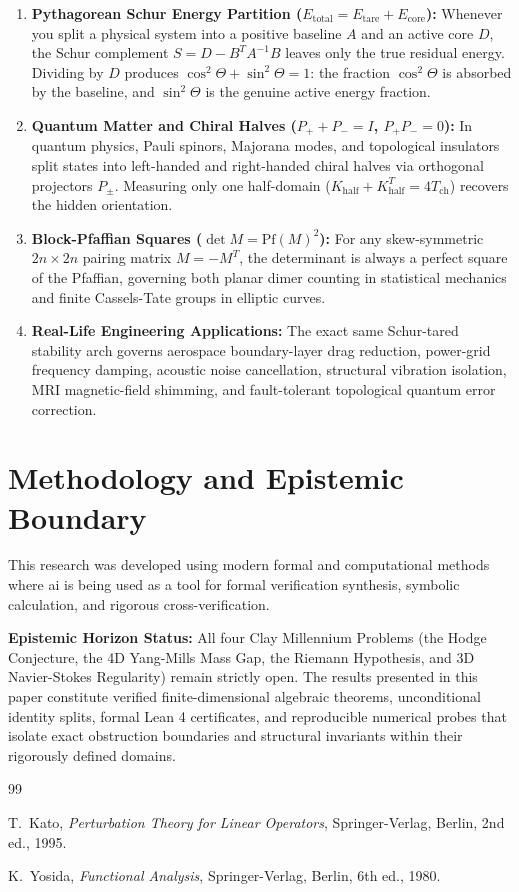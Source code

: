 \documentclass[11pt,a4paper]{article}
\theoremstyle{definition}
\begin{document}
\begin{enumerate}
  \item \textbf{Pythagorean Schur Energy Partition ($E_{\mathrm{total}} = E_{\mathrm{tare}} + E_{\mathrm{core}}$):} Whenever you split a physical system into a positive baseline $A$ and an active core $D$, the Schur complement $S = D - B^T A^{-1} B$ leaves only the true residual energy. Dividing by $D$ produces $\cos^2\Theta + \sin^2\Theta = 1$: the fraction $\cos^2\Theta$ is absorbed by the baseline, and $\sin^2\Theta$ is the genuine active energy fraction.
  \item \textbf{Quantum Matter and Chiral Halves ($P_+ + P_- = I$, $P_+ P_- = 0$):} In quantum physics, Pauli spinors, Majorana modes, and topological insulators split states into left-handed and right-handed chiral halves via orthogonal projectors $P_\pm$. Measuring only one half-domain ($K_{\mathrm{half}} + K_{\mathrm{half}}^T = 4 T_{\mathrm{ch}}$) recovers the hidden orientation.
  \item \textbf{Block-Pfaffian Squares ($\det M = \mathrm{Pf}(M)^2$):} For any skew-symmetric $2n \times 2n$ pairing matrix $M = -M^T$, the determinant is always a perfect square of the Pfaffian, governing both planar dimer counting in statistical mechanics and finite Cassels-Tate groups in elliptic curves.
  \item \textbf{Real-Life Engineering Applications:} The exact same Schur-tared stability arch governs aerospace boundary-layer drag reduction, power-grid frequency damping, acoustic noise cancellation, structural vibration isolation, MRI magnetic-field shimming, and fault-tolerant topological quantum error correction.
\end{enumerate}

\section{Methodology and Epistemic Boundary}
\noindent This research was developed using modern formal and computational methods where ai is being used as a tool for formal verification synthesis, symbolic calculation, and rigorous cross-verification.

\vspace{0.5em}
\noindent\textbf{Epistemic Horizon Status:} All four Clay Millennium Problems (the Hodge Conjecture, the 4D Yang-Mills Mass Gap, the Riemann Hypothesis, and 3D Navier-Stokes Regularity) remain strictly open. The results presented in this paper constitute verified finite-dimensional algebraic theorems, unconditional identity splits, formal Lean 4 certificates, and reproducible numerical probes that isolate exact obstruction boundaries and structural invariants within their rigorously defined domains.

\begin{thebibliography}{99}

T.~Kato,
\textit{Perturbation Theory for Linear Operators},
Springer-Verlag, Berlin, 2nd ed., 1995.

K.~Yosida,
\textit{Functional Analysis},
Springer-Verlag, Berlin, 6th ed., 1980.

\end{thebibliography}
\end{document}
